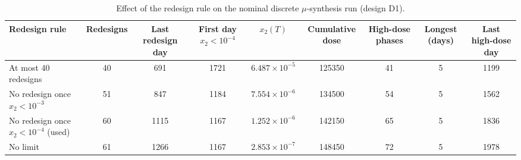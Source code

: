 \begin{table}[htbp]
\centering
\caption{Effect of the redesign rule on the nominal discrete $\mu$-synthesis run (design D1).}
\label{tab:mu_rules}
\small
\begin{tabular}{lcccccccc}
\toprule
Redesign rule & Redesigns & Last redesign day & First day $x_2<10^{-4}$ & $x_2(T)$ & Cumulative dose & High-dose phases & Longest (days) & Last high-dose day \\
\midrule
At most 40 redesigns & 40 & 691 & 1721 & $6.487{\times}10^{-5}$ & 125350 & 41 & 5 & 1199 \\
No redesign once $x_2<10^{-3}$ & 51 & 847 & 1184 & $7.554{\times}10^{-6}$ & 134500 & 54 & 5 & 1562 \\
No redesign once $x_2<10^{-4}$ (used) & 60 & 1115 & 1167 & $1.252{\times}10^{-6}$ & 142150 & 65 & 5 & 1836 \\
No limit & 61 & 1266 & 1167 & $2.853{\times}10^{-7}$ & 148450 & 72 & 5 & 1978 \\
\bottomrule
\end{tabular}
\end{table}
